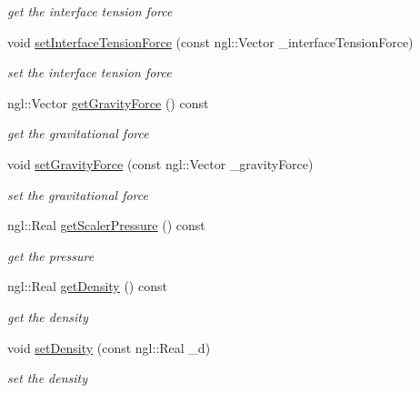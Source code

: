 \begin{DoxyCompactItemize}
\begin{DoxyCompactList}\small\item\em get the interface tension force \item\end{DoxyCompactList}\item 
void \hyperlink{class_fluid_particle_a33e789925811ce4517440460e5423531}{setInterfaceTensionForce} (const ngl::Vector \_\-interfaceTensionForce)
\begin{DoxyCompactList}\small\item\em set the interface tension force \item\end{DoxyCompactList}\item 
ngl::Vector \hyperlink{class_fluid_particle_aaf55f4024213da74d1e2ba1043b8bf5d}{getGravityForce} () const 
\begin{DoxyCompactList}\small\item\em get the gravitational force \item\end{DoxyCompactList}\item 
void \hyperlink{class_fluid_particle_aa50bfbb2492827bbe49e52159b98e28e}{setGravityForce} (const ngl::Vector \_\-gravityForce)
\begin{DoxyCompactList}\small\item\em set the gravitational force \item\end{DoxyCompactList}\item 
ngl::Real \hyperlink{class_fluid_particle_ae0122ebaedcbf00aed6ab9b4f8559bf2}{getScalerPressure} () const 
\begin{DoxyCompactList}\small\item\em get the pressure \item\end{DoxyCompactList}\item 
ngl::Real \hyperlink{class_fluid_particle_ae46a808efdc6e4132ee84564fb644fab}{getDensity} () const 
\begin{DoxyCompactList}\small\item\em get the density \item\end{DoxyCompactList}\item 
void \hyperlink{class_fluid_particle_acdb806b3044bed4ca7cad4a65bfc6aea}{setDensity} (const ngl::Real \_\-d)
\begin{DoxyCompactList}\small\item\em set the density \item\end{DoxyCompactList}\item 

\end{DoxyCompactItemize}
